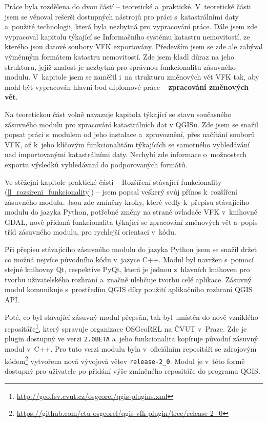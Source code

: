 \documentclass[a4paper,12pt,oneside]{book}
\begin{document}
Práce byla rozdělena do dvou částí -- teoretické
a~praktické. V~teoretické části jsem se věnoval rešerši dostupných
nástrojů pro práci s~katastrálními daty a~použité
technologii, která byla nezbytná pro vypracování práce. Dále jsem zde
vypracoval kapitolu týkající se Informačního systému katastru
nemovitostí, ze kterého jsou datové soubory VFK exportovány. Především
jsem se zde ale zabýval výměnným formátem katastru nemovitostí. Zde
jsem kladl důraz na jeho strukturu, jejíž znalost je nezbytná pro
správnou funkcionalitu zásuvného modulu. V~kapitole jsem se zaměřil
i~na strukturu změnových vět VFK tak, aby mohl být vypracován hlavní
bod diplomové práce -- \textbf{zpracování změnových vět}.

Na teoretickou část volně navazuje kapitola týkající se stavu
současného zásuvného modulu pro zpracování katastrálních dat v
QGISu. Zde jsem se snažil popsat práci s~modulem od jeho instalace
a~zprovoznění, přes načítání souborů VFK, až k~jeho klíčovým
funkcionalitám týkajících se samotného vyhledávání nad importovanými
katastrálními daty. Nechybí zde informace o~možnostech exportu
výsledků vyhledávaní do podporovaných formátů.

Ve stěžejní kapitole praktické části -- Rozšíření stávající
funkcionality (\ref{l_rozsireni_funkcionality}) -- jsem popsal veškerý
svůj přínos k~rozšíření zásuvného modulu. Jsou zde zmíněny kroky,
které vedly k~přepisu stávajícího modulu do jazyka Python, potřebné
změny na straně ovladače VFK v~knihovně GDAL, nově přidaná
funkcionalita týkající se zpracování změnových vět a~popis tříd
zásuvného modulu, pro rychlejší orientaci v~kódu.

Při přepisu stávajícího zásuvného modulu do jazyka Python jsem se
snažil držet co možná nejvíce původního kódu v~jazyce C++. Modul byl
navržen s~pomocí stejné knihovny Qt, respektive PyQt, která je jednou
z~hlavních knihoven pro tvorbu uživatelského rozhraní a~značně
ulehčuje tvorbu celé aplikace. Zásuvný modul komunikuje s~prostředím
QGIS díky použití aplikačního rozhraní QGIS API.

Poté, co byl stávající zásuvný modul přepsán, tak byl umístěn do nově
vzniklého
repositáře\footnote{\url{http://geo.fsv.cvut.cz/osgeorel/qgis-plugins.xml}},
který spravuje organizace OSGeoREL na ČVUT v~Praze. Zde je plugin
dostupný ve verzi \texttt{2.0BETA} a~jeho funkcionalita kopíruje
původní zásuvný modul v~C++. Pro tuto verzi modulu byla v~oficiálním
repositáři se zdrojovým
kódem\footnote{\url{https://github.com/ctu-osgeorel/qgis-vfk-plugin/tree/release-2_0}}
vytvořena nová vývojová větev \texttt{release-2\_0}. Modul je v~této
formě dostupný pro uživatele po přidání výše zmíněného repositáře do
programu QGIS.
\end{document}
